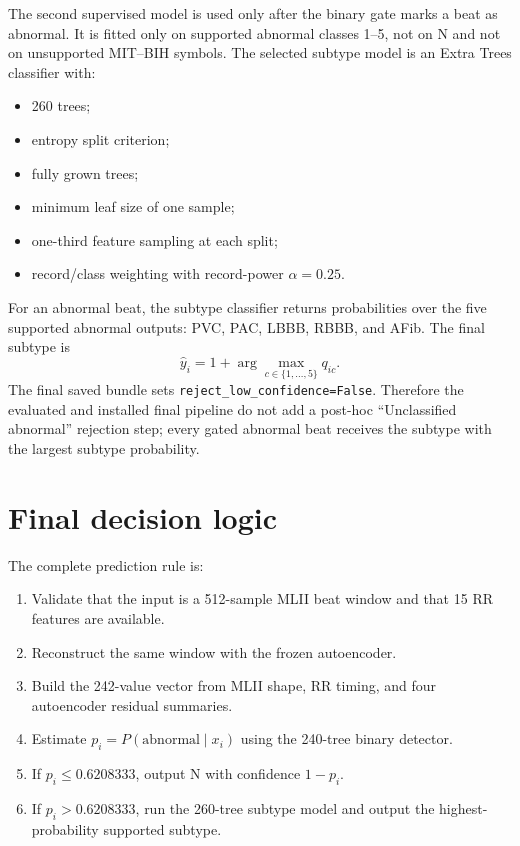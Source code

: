 The second supervised model is used only after the binary gate marks a beat as
abnormal. It is fitted only on supported abnormal classes 1--5, not on N and
not on unsupported MIT--BIH symbols. The selected subtype model is an Extra
Trees classifier with:
\begin{itemize}
\item 260 trees;
\item entropy split criterion;
\item fully grown trees;
\item minimum leaf size of one sample;
\item one-third feature sampling at each split;
\item record/class weighting with record-power $\alpha=0.25$.
\end{itemize}

For an abnormal beat, the subtype classifier returns probabilities over the
five supported abnormal outputs: PVC, PAC, LBBB, RBBB, and AFib. The final
subtype is
\begin{equation}
 \widehat y_i=1+\arg\max_{c\in\{1,\ldots,5\}}q_{ic}.
 \label{eq:final-decision}
\end{equation}
The final saved bundle sets \texttt{reject\_low\_confidence=False}. Therefore
the evaluated and installed final pipeline do not add a post-hoc
``Unclassified abnormal'' rejection step; every gated abnormal beat receives
the subtype with the largest subtype probability.

\section{Final decision logic}

The complete prediction rule is:
\begin{enumerate}
\item Validate that the input is a 512-sample MLII beat window and that 15 RR
features are available.
\item Reconstruct the same window with the frozen autoencoder.
\item Build the 242-value vector from MLII shape, RR timing, and four
autoencoder residual summaries.
\item Estimate $p_i=P(\mathrm{abnormal}\mid x_i)$ using the 240-tree binary
detector.
\item If $p_i\leq0.6208333$, output N with confidence $1-p_i$.
\item If $p_i>0.6208333$, run the 260-tree subtype model and output the
highest-probability supported subtype.
\end{enumerate}


